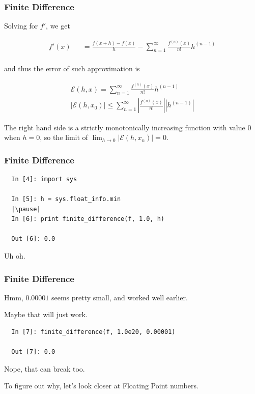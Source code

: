 \documentclass{beamer}
\begin{document}
\begin{frame}[fragile]
\frametitle{Finite Difference}

Solving for $f'$, we get

\begin{eqnarray*} f'(x) && = \frac{f(x+h) - f(x)}{h} - \sum_{n = 1}^{\infty} \frac{f^{(n)}(x)}{n!}h^{(n-1)} \\ \end{eqnarray*}

and thus the error of such approximation is

\begin{eqnarray*}
\mathcal{E}(h, x) = \sum_{n = 1}^{\infty} \frac{f^{(n)}(x)}{n!}h^{(n-1)} \\
\left \vert \mathcal{E}(h, x_0) \right \vert \le \sum_{n = 1}^{\infty} \left \vert \frac{f^{(n)}(x)}{n!} \right \vert \left \vert h^{(n-1)} \right \vert
\end{eqnarray*}

The right hand side is a strictly monotonically increasing function with value $0$ when $h=0$, so the limit of $\lim_{h \to 0} \left \vert \mathcal{E}(h, x_n) \right \vert = 0$.

\end{frame}

\begin{frame}[fragile]
\frametitle{Finite Difference}

\begin{lstlisting}
  In [4]: import sys

  In [5]: h = sys.float_info.min
  |\pause|
  In [6]: print finite_difference(f, 1.0, h)

  Out [6]: 0.0
\end{lstlisting}


Uh oh.

\end{frame}

\begin{frame}[fragile]
\frametitle{Finite Difference}

Hmm, $0.00001$ seems pretty small, and worked well earlier.

Maybe that will just work.

\pause

\begin{lstlisting}
  In [7]: finite_difference(f, 1.0e20, 0.00001)

  Out [7]: 0.0
\end{lstlisting}

Nope, that can break too.

To figure out why, let's look closer at Floating Point numbers.

\end{frame}
\end{document}

